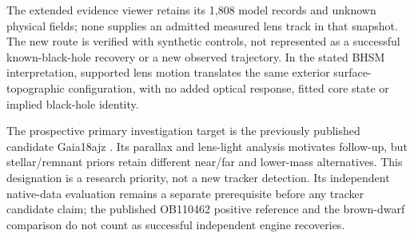 The extended
evidence viewer retains its 1,808 model records and unknown physical
fields; none supplies an admitted measured lens track in that snapshot.
The new route is verified with synthetic controls, not represented as
a successful known-black-hole recovery or a new observed trajectory.
In the stated BHSM interpretation, supported lens motion translates
the same exterior surface-topographic configuration, with no added
optical response, fitted core state or implied black-hole identity.

The prospective primary investigation target is the previously published
candidate Gaia18ajz \cite{Howil2025Gaia18ajz}. Its parallax and lens-light
analysis motivates follow-up, but stellar/remnant priors retain different
near/far and lower-mass alternatives. This designation is a research
priority, not a new tracker detection. Its independent native-data
evaluation remains a separate prerequisite before any tracker candidate
claim; the published OB110462 positive reference and the brown-dwarf
comparison do not count as successful independent engine recoveries.
